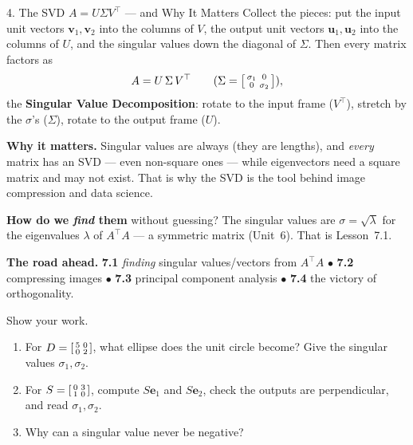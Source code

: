 \documentclass[10pt]{article}
\newcommand{\uu}{\mathbf{u}}
\newcommand{\vv}{\mathbf{v}}
\newcommand{\ee}{\mathbf{e}}
\newcommand{\T}{^{\top}}
\begin{document}
\begin{notesbox}{4. The SVD $A=U\Sigma V\T$ --- and Why It Matters}
Collect the pieces: put the input unit vectors $\vv_1,\vv_2$ into the columns of $V$, the output unit
vectors $\uu_1,\uu_2$ into the columns of $U$, and the singular values down the diagonal of $\Sigma$.
Then every matrix factors as
\[
  A = U\,\Sigma\,V\T \qquad(\Sigma=\begin{bsmallmatrix} \sigma_1 & 0\\ 0 & \sigma_2 \end{bsmallmatrix}),
\]
the \textbf{Singular Value Decomposition}: rotate to the input frame ($V\T$), stretch by the
$\sigma$'s ($\Sigma$), rotate to the output frame ($U$).

\vspace{2pt}
\textbf{Why it matters.} Singular values are always \blank{2.6cm} (they are lengths), and
\emph{every} matrix has an SVD --- even non-square ones --- while eigenvectors need a square matrix and
may not exist. That is why the SVD is the tool behind image compression and data science.

\vspace{2pt}
\textbf{How do we \emph{find} them} without guessing? The singular values are $\sigma=\sqrt{\lambda}$ for
the eigenvalues $\lambda$ of $A\T A$ --- a symmetric matrix (Unit~6). That is Lesson~7.1.

\vspace{2pt}
\textbf{The road ahead.} \textbf{7.1} \emph{finding} singular values/vectors from $A\T A$\; $\bullet$\;
\textbf{7.2} compressing images\; $\bullet$\; \textbf{7.3} principal component analysis\; $\bullet$\;
\textbf{7.4} the victory of orthogonality.
\end{notesbox}

\begin{practicebox}
Show your work.
\begin{enumerate}[leftmargin=1.6em, itemsep=4pt]
  \item For $D=\begin{bsmallmatrix} 5 & 0\\ 0 & 2 \end{bsmallmatrix}$, what ellipse does the unit circle become? Give the singular values $\sigma_1,\sigma_2$. \writeline
  \item For $S=\begin{bsmallmatrix} 0 & 3\\ 1 & 0 \end{bsmallmatrix}$, compute $S\ee_1$ and $S\ee_2$, check the outputs are perpendicular, and read $\sigma_1,\sigma_2$. \writeline
  \item Why can a singular value never be negative? \writeline
\end{enumerate}
\end{practicebox}
\end{document}
